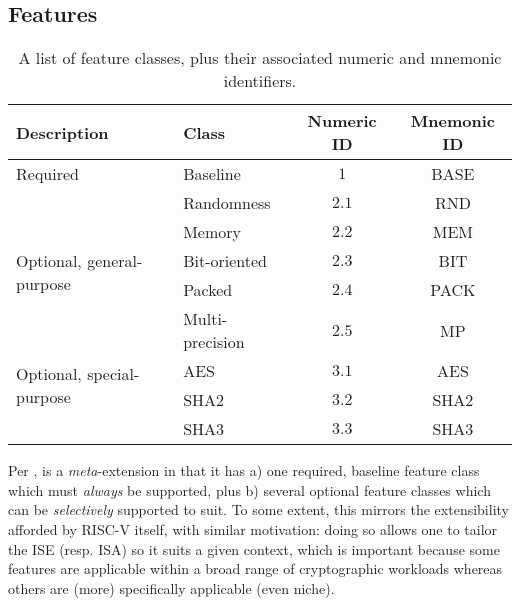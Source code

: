
\subsection{Features}
\label{sec:bg:feature}

\begin{table}[t]
\begin{center}
\begin{tabular}{|l|l|cc|}
\hline
Description                                & Class           & Numeric ID & Mnemonic ID \\
\hline\hline
\multirow{1}{*}{Required                 } & Baseline        & $1$        & BASE        \\
\hline
\multirow{5}{*}{Optional, general-purpose} & Randomness      & $2.1$      & RND         \\
                                           & Memory          & $2.2$      & MEM         \\
                                           & Bit-oriented    & $2.3$      & BIT         \\
                                           & Packed          & $2.4$      & PACK        \\
                                           & Multi-precision & $2.5$      & MP          \\
\hline
\multirow{2}{*}{Optional, special-purpose} & AES             & $3.1$      & AES         \\
                                           & SHA2            & $3.2$      & SHA2        \\
                                           & SHA3            & $3.3$      & SHA3        \\
\hline
\end{tabular}
\end{center}
\caption{A list of feature classes, plus their associated numeric and mnemonic identifiers.}
\label{tab:feature}
\end{table}

Per , \XCRYPTO is a {\em meta}-extension in that it has 
a) one     required, baseline feature class
   which must {\em always} be supported,
   plus
b) several optional           feature classes
   which can be {\em selectively} supported to suit.
To some extent, this mirrors the extensibility afforded by RISC-V itself, 
with similar motivation: doing so allows one to tailor the ISE (resp. ISA) 
so it suits a given context, which is important because some features are 
applicable within a broad range of cryptographic workloads whereas others 
are (more) specifically applicable (even niche).

